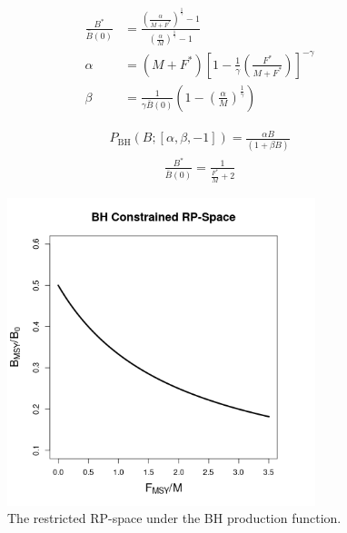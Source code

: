 \documentclass[12pt]{article}
\begin{document}
\begin{align}
\frac{B^*}{\bar B(0)} &= \frac{ \left(\frac{\alpha}{M+F^*}\right)^\frac{1}{\gamma}-1 }{ \left(\frac{\alpha}{M}\right)^\frac{1}{\gamma}-1 } \nonumber\\
\alpha &= (M+F^*)\left[ 1-\frac{1}{\gamma}\left(\frac{F^*}{M+F^*}\right) \right]^{-\gamma} \label{system}\\
\beta  &= \frac{1}{\gamma\bar B(0)}\left( 1-\left(\frac{\alpha}{M}\right)^\frac{1}{\gamma} \right)  \nonumber
\end{align}

%
\clearpage

\begin{figure}[h!]
\begin{minipage}[h!]{0.54\textwidth}
\begin{align}
P_\text{BH}(B;[\alpha, \beta, -1]) = \frac{\alpha B}{(1+\beta B)} \nonumber
\end{align}
\begin{align}
\frac{B^*}{\bar B(0)} = \frac{1}{\frac{F^*}{M}+2} \nonumber
\end{align}
\caption{\label{bhRP} The restricted RP-space under the BH production function.}
\end{minipage}
\begin{minipage}[h!]{0.44\textwidth}
\includegraphics[width=0.8\textwidth]{plots/bhRP.png}
\end{minipage}
\end{figure}
\end{document}
